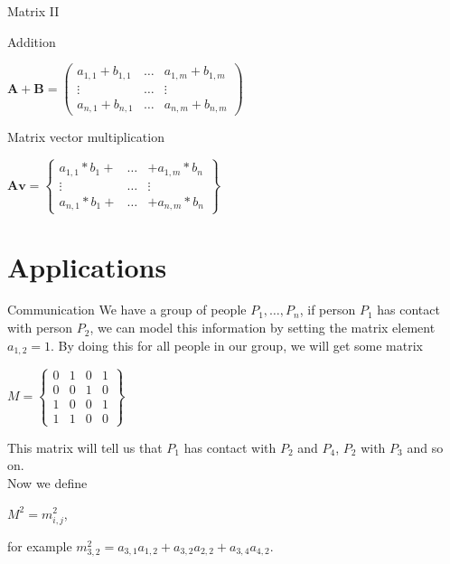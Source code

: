 \documentclass[12pt,t]{beamer}
\begin{document}
\begin{frame}{Matrix II}

\begin{block}{Addition}
\begin{center}
$ \mathbf{A} + \mathbf{B}  = \begin{pmatrix}
a_{1,1} + b_{1,1}  & \ldots & a_{1,m} + b_{1,m} \\
\vdots & \ldots & \vdots \\
a_{n,1} + b_{n,1} & \ldots & a_{n,m} + b_{n,m} 
\end{pmatrix} $
\end{center}
\end{block}

\begin{block}{Matrix vector multiplication}
\begin{center}
$ \mathbf{A}  \mathbf{v}  = \left\lbrace\begin{matrix}
a_{1,1} * b_{1} + & \ldots & + a_{1,m} * b_{n} \\
\vdots & \ldots & \vdots \\
a_{n,1} * b_{1} + & \ldots & + a_{n,m} * b_{n} 
\end{matrix} \right\rbrace $
\end{center}
\end{block}

\end{frame}


\section{Applications}


\begin{frame}{Communication}
We have a group of people $P_1,\ldots,P_n$, if person $P_1$ has contact with person $P_2$, we can model this information by setting the matrix element $a_{1,2}=1$. By doing this for all people in our group, we will get some matrix \\

\begin{center}
$
M = \left\lbrace\begin{matrix}
0 & 1 & 0 & 1 \\
0 & 0 & 1 & 0 \\
1 & 0 & 0 & 1 \\
1 & 1 & 0 & 0
\end{matrix} \right\rbrace
$
\end{center}
This matrix will tell us that $P_1$ has contact with $P_2$ and $P_4$, $P_2$ with $P_3$ and so on. \\
Now we define
\begin{center}
$M^2 = m^2_{i,j}$,  
\end{center}
for example $m^2_{3,2}=a_{3,1}a_{1,2}+a_{3,2}a_{2,2}+a_{3,4}a_{4,2}$.
\end{frame}
\end{document}
